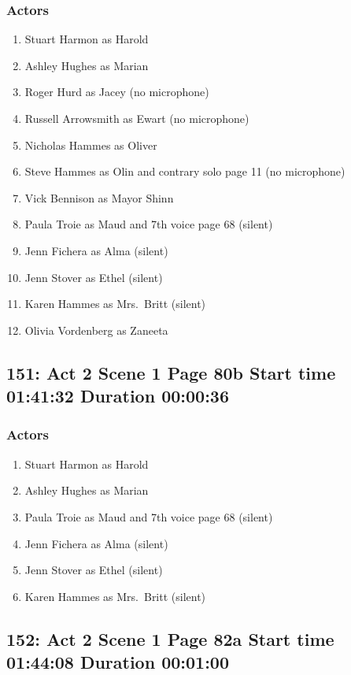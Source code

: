 \subsubsection{Actors}
\begin{enumerate}
\item Stuart Harmon as Harold
\item Ashley Hughes as Marian
\item Roger Hurd as Jacey (no microphone)
\item Russell Arrowsmith as Ewart (no microphone)
\item Nicholas Hammes as Oliver
\item Steve Hammes as Olin and contrary solo page 11 (no microphone)
\item Vick Bennison as Mayor Shinn
\item Paula Troie as Maud and 7th voice page 68 (silent)
\item Jenn Fichera as Alma (silent)
\item Jenn Stover as Ethel (silent)
\item Karen Hammes as Mrs.~Britt (silent)
\item Olivia Vordenberg as Zaneeta
\end{enumerate}


\subsection{151: Act 2 Scene 1 Page 80b Start time 01:41:32 Duration 00:00:36}

\subsubsection{Actors}
\begin{enumerate}
\item Stuart Harmon as Harold
\item Ashley Hughes as Marian
\item Paula Troie as Maud and 7th voice page 68 (silent)
\item Jenn Fichera as Alma (silent)
\item Jenn Stover as Ethel (silent)
\item Karen Hammes as Mrs.~Britt (silent)
\end{enumerate}


\subsection{152: Act 2 Scene 1 Page 82a Start time 01:44:08 Duration 00:01:00}

